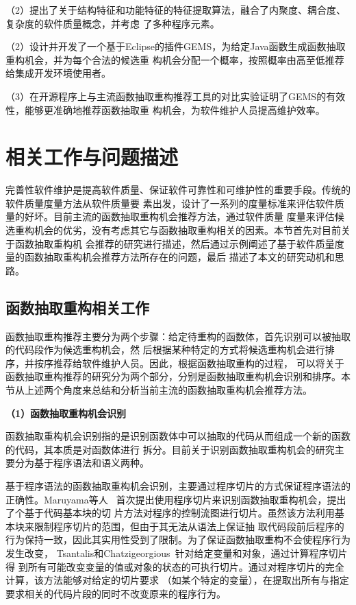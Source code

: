（2）提出了关于结构特征和功能特征的特征提取算法，融合了内聚度、耦合度、复杂度的软件质量概念，并考虑
了多种程序元素。

（2）设计并开发了一个基于Eclipse的插件GEMS，为给定Java函数生成函数抽取重构机会，并为每个合法的候选重
构机会分配一个概率，按照概率由高至低推荐给集成开发环境使用者。

（3）在开源程序上与主流函数抽取重构推荐工具的对比实验证明了GEMS的有效性，能够更准确地推荐函数抽取重
构机会，为软件维护人员提高维护效率。

\section{相关工作与问题描述}
完善性软件维护是提高软件质量、保证软件可靠性和可维护性的重要手段。传统的软件质量度量方法从软件质量要
素出发，设计了一系列的度量标准来评估软件质量的好坏。目前主流的函数抽取重构机会推荐方法，通过软件质量
度量来评估候选重构机会的优劣，没有考虑其它与函数抽取重构相关的因素。本节首先对目前关于函数抽取重构机
会推荐的研究进行描述，然后通过示例阐述了基于软件质量度量的函数抽取重构机会推荐方法所存在的问题，最后
描述了本文的研究动机和思路。

\subsection{函数抽取重构相关工作}
函数抽取重构推荐主要分为两个步骤：给定待重构的函数体，首先识别可以被抽取的代码段作为候选重构机会，然
后根据某种特定的方式将候选重构机会进行排序，并按序推荐给软件维护人员。因此，根据函数抽取重构的过程，
可以将关于函数抽取重构推荐的研究分为两个部分，分别是函数抽取重构机会识别和排序。本节从上述两个角度来总结和分析当前主流的函数抽取重构机会推荐方法。

\textbf{（1）函数抽取重构机会识别}

函数抽取重构机会识别指的是识别函数体中可以抽取的代码从而组成一个新的函数的代码，其本质是对函数体进行
拆分。目前关于识别函数抽取重构机会的研究主要分为基于程序语法和语义两种。

基于程序语法的函数抽取重构机会识别，主要通过程序切片的方式保证程序语法的正确性。Maruyama等人
~\cite{maruyama2001automated}首次提出使用程序切片来识别函数抽取重构机会，提出了个基于代码基本块的切
片方法对程序的控制流图进行切片。虽然该方法利用基本块来限制程序切片的范围，但由于其无法从语法上保证抽
取代码段前后程序的行为保持一致，因此其实用性受到了限制。为了保证函数抽取重构不会使程序行为发生改变，
Tsantalis和Chatzigeorgious~\cite{tsantalis2011identification}针对给定变量和对象，通过计算程序切片得
到所有可能改变变量的值或对象的状态的可执行切片。通过对程序切片的完全计算，该方法能够对给定的切片要求
（如某个特定的变量），在提取出所有与指定要求相关的代码片段的同时不改变原来的程序行为。

